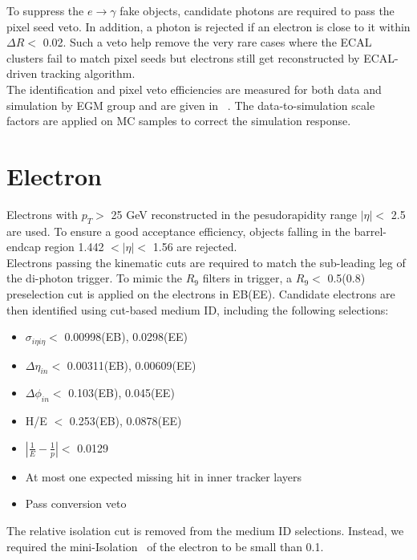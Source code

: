 \documentclass[thesis.tex]{subfiles}
\renewcommand\_{\textunderscore\allowbreak}
\begin{document}
To suppress the $e\rightarrow\gamma$ fake objects, candidate photons are required to pass the pixel seed veto. In addition, a photon is rejected if an electron is close to it within $\Delta R <$ 0.02. Such a veto help remove the very rare cases where the ECAL clusters fail to match pixel seeds but electrons still get reconstructed by ECAL-driven tracking algorithm. \\

The identification and pixel veto efficiencies are measured for both data and simulation by EGM group and are given in ~\cite{EGM:leptonScale}. The data-to-simulation scale factors are applied on MC samples to correct the simulation response.

\section{Electron}
\label{subsec:electronID} 
Electrons with  $p_{T} >$ 25 GeV reconstructed in the pesudorapidity range $|\eta| <$ 2.5 are used. To ensure a good acceptance efficiency, objects falling in the barrel-endcap region 1.442 $< |\eta| <$ 1.56 are rejected.  \\

Electrons passing the kinematic cuts are required to match the sub-leading leg of the di-photon trigger. To mimic the $R_9$ filters in trigger, a $R_9 <$ 0.5(0.8) preselection cut is applied on the electrons in EB(EE). Candidate electrons are then identified using cut-based medium ID, including the following selections:

\begin{center}
\begin{itemize}
\item $\sigma_{i\eta i\eta} <$ 0.00998(EB), 0.0298(EE)
\item $\Delta\eta_{in} <$ 0.00311(EB), 0.00609(EE)
\item $\Delta\phi_{in} <$ 0.103(EB), 0.045(EE)
\item H/E $<$ 0.253(EB), 0.0878(EE)
\item $|\frac{1}{E} - \frac{1}{p}| <$ 0.0129
\item At most one expected missing hit in inner tracker layers
\item Pass conversion veto
\end{itemize}
\end{center}

The relative isolation cut is removed from the medium ID selections. Instead, we required the mini-Isolation~\cite{CMS:Isolation} of the electron to be small than 0.1. \\
\end{document}
